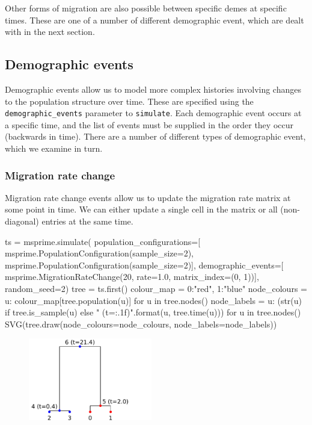 \documentclass[graybox]{svmult}
\newcommand{\includenbimage}[1]{\begin{center}\texttt{[image: \#1]}\end{center}}
\begin{document}
Other forms of migration are also possible between specific demes at
specific times. These are one of a number of different demographic
event, which are dealt with in the next section.

\subsection{Demographic events}\label{demographic-events}

Demographic events allow us to model more complex histories involving
changes to the population structure over time. These are specified using
the \texttt{demographic\_events} parameter to \texttt{simulate}. Each
demographic event occurs at a specific time, and the list of events must
be supplied in the order they occur (backwards in time). There are a
number of different types of demographic event, which we examine in
turn.

\subsubsection{Migration rate change}\label{migration-rate-change}

Migration rate change events allow us to update the migration rate
matrix at some point in time. We can either update a single cell in the
matrix or all (non-diagonal) entries at the same time.
\begin{pythoncode}
ts  = msprime.simulate(
    population_configurations=[
        msprime.PopulationConfiguration(sample_size=2),
        msprime.PopulationConfiguration(sample_size=2)],
    demographic_events=[
        msprime.MigrationRateChange(20, rate=1.0, matrix_index=(0, 1))],
    random_seed=2)
tree = ts.first()
colour_map = {0:"red", 1:"blue"}
node_colours = {u: colour_map[tree.population(u)] for u in tree.nodes()}
node_labels = {
    u: (str(u) if tree.is_sample(u) else "{} (t={:.1f})".format(u,
tree.time(u)))
    for u in tree.nodes()}
SVG(tree.draw(node_colours=node_colours, node_labels=node_labels))
\end{pythoncode}

\begin{figure}
  \begin{center}
    \includegraphics[width=0.48\textwidth]{images/simulations_34_0.pdf}
  \end{center}
\end{figure}
\end{document}
